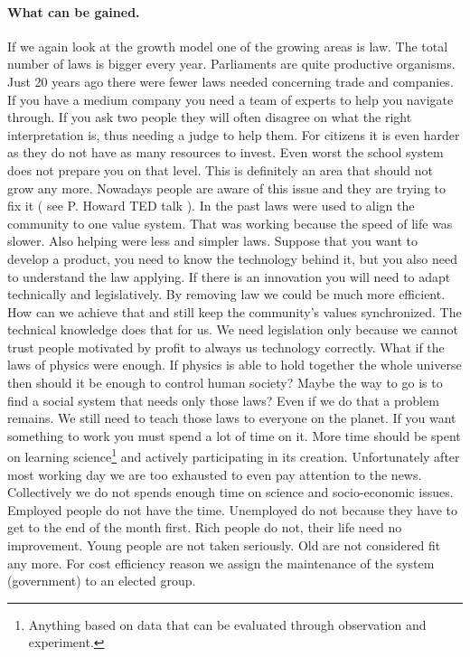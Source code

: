 \documentclass{article}
\begin{document}
\paragraph{What can be gained.}
If we again look at the growth model one of the growing areas is law.
The total number of laws is bigger every year.
Parliaments are quite productive organisms.
Just 20 years ago there were fewer laws needed concerning trade and companies.
If you have a medium company you need a team of experts to help you navigate through.
If you ask two people they will often disagree on what the right interpretation is, thus needing a judge to help them.
For citizens it is even harder as they do not have as many resources to invest.
Even worst the school system does not prepare you on that level.
This is definitely an area that should not grow any more.
Nowadays people are aware of this issue and they are trying to fix it ( see P. Howard TED talk \cite{simple_law}).
In the past laws were used to align the community to one value system.
That was working because the speed of life was slower.
Also helping were less and simpler laws.
Suppose that you want to develop a product, you need to know the technology behind it, but you also need to understand the law applying.
If there is an innovation you will need to adapt technically and legislatively.
By removing law we could be much more efficient.
How can we achieve that and still keep the community's values synchronized.
The technical knowledge does that for us.
We need legislation only because we cannot trust people motivated by profit to always us  technology correctly.
What if the laws of physics were enough.
If physics is able to hold together the whole universe then should it be enough to control human society?
Maybe the way to go is to find a social system that needs only those laws?
Even if we do that a problem remains.
We still need to teach those laws to everyone on the planet.
If you want something to work you must spend a lot of time on it.
More time should be spent on learning science\footnote{Anything based on data that can be evaluated through observation and experiment.} and actively participating in its creation.
Unfortunately after most working day we are too exhausted to even pay attention to the news.
Collectively we do not spends enough time on science and socio-economic issues.
Employed people do not have the time.
Unemployed do not because they have to get to the end of the month first.
Rich people do not, their life need no improvement.
Young people are not taken seriously.
Old are not considered fit any more.
For cost efficiency reason we assign the maintenance of the system (government) to an elected group.
\end{document}
